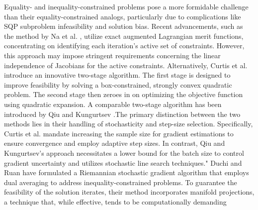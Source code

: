 \documentclass[aos]{imsart}
\numberwithin{equation}{section}
\theoremstyle{plain}
\begin{document}
Equality- and inequality-constrained problems pose a more formidable challenge than their equality-constrained analogs, particularly due to complications like SQP subproblem infeasibility and solution bias. 
Recent advancements, such as the method by Na et al. \cite{na2023adaptive}, utilize exact augmented Lagrangian merit functions, concentrating on identifying each iteration's active set of constraints. However, this approach may impose stringent requirements concerning the linear independence of Jacobians for the active constraints.
Alternatively, Curtis et al. \cite{curtis2023sequential} introduce an innovative two-stage algorithm. The first stage is designed to improve feasibility by solving a box-constrained, strongly convex quadratic problem. The second stage then zeroes in on optimizing the objective function using quadratic expansion. A comparable two-stage algorithm has been introduced by Qiu and Kungurtsev \cite{qiu2023sequential}.The primary distinction between the two methods lies in their handling of stochasticity and step-size selection. Specifically, Curtis et al. mandate increasing the sample size for gradient estimations to ensure convergence and employ adaptive step sizes. In contrast, Qiu and Kungurtsev's approach \cite{qiu2023sequential} necessitates a lower bound for the batch size to control gradient uncertainty and utilizes stochastic line search techniques."
Duchi and Ruan \cite{duchi2021asymptotic} have formulated a Riemannian stochastic gradient algorithm that employs dual averaging to address inequality-constrained problems. To guarantee the feasibility of the solution iterates, their method incorporates manifold projections, a technique that, while effective, tends to be computationally demanding
\end{document}
